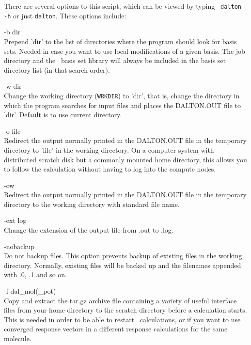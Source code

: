 There are several options to this script,
which can be viewed by typing \verb| dalton -h| or just \verb|dalton|.
These options include:

\begin{list}{--}{}
\item[-b dir \hfill] \hfill \\
  Prepend 'dir' to the list of directories where the program
  should look for basis sets. Needed in case you want to use
  local modifications of a given basis. The job directory and the \dalton\ basis set library will always be included in the basis set directory list
  (in that search order).
\item[-w dir \hfill] \hfill \\
  Change the working directory (\verb|WRKDIR|) to 'dir', that is,
  change the directory in which the program searches for input files
  and places the DALTON.OUT file to 'dir'. Default is to use current
  directory.
\item[-o file \hfill] \hfill \\
  Redirect the output normally printed in the
  DALTON.OUT file in the temporary directory
  to 'file' in the working
  directory. On a computer system with distributed scratch disk but a
  commonly mounted home directory, this allows you to follow the
  calculation without having to log into the compute nodes.
\item[-ow \hfill] \hfill \\
  Redirect the output normally printed in the
  DALTON.OUT file in the temporary directory
  to the working directory with standard file name.
\item[-ext log \hfill] \hfill \\
  Change the extension of the output file from .out to .log.
\item[-nobackup \hfill] \hfill \\
  Do not backup files. This option prevents backup of existing files in the working
  directory. Normally, existing files will be backed up and the filenames appended with
  .0, .1 and so on.
\item[-f dal\_mol(\_pot) \hfill] \hfill \\
  Copy and extract the tar.gz archive file containing a variety of useful
  interface files from your home directory to the scratch directory
  before a calculation starts. This is needed in order to be able to
  restart \dalton\ calculations, or if you want to use converged response
  vectors in a different response calculations for the same molecule.

\end{list}
